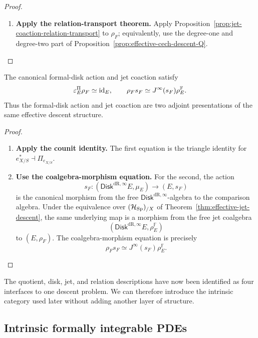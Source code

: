 \begin{proof}
\leavevmode
\begin{enumerate}[label=\textup{(\arabic*)}]
    \item \textbf{Apply the relation-transport theorem.}
Apply Proposition~\ref{prop:jet-coaction-relation-transport} to
\(\rho_F\); equivalently, use the degree-one and degree-two part of
Proposition~\ref{prop:effective-cech-descent-Q}.
\end{enumerate}
\end{proof}

\begin{proposition}
\label{prop:mate-relation-explicit}
The canonical formal-disk action and jet coaction satisfy
\[
  \varepsilon^\Pi_E\rho_F\simeq\operatorname{id}_E,
  \qquad
  \rho_Fs_F\simeq J^\infty(s_F)\rho_E^{\mathbb F}.
\]
Thus the formal-disk action and jet coaction are two adjoint presentations of the
same effective descent structure.
\end{proposition}

\begin{proof}
\leavevmode
\begin{enumerate}[label=\textup{(\arabic*)}]
    \item \textbf{Apply the counit identity.}
The first equation is the triangle identity for
\(e_{X/S}^*\dashv\Pi_{e_{X/S}}\).

    \item \textbf{Use the coalgebra-morphism equation.}
For the second, the action
\[
  s_F:(\mathsf{Disk}^{\mathrm{dR},\infty} E,\mu_E)\longrightarrow(E,s_F)
\]
is the canonical morphism from the free \(\mathsf{Disk}^{\mathrm{dR},\infty}\)-algebra to the comparison
algebra. Under the equivalence over \((\mathcal H_{\operatorname{Sp}})_{/X}\) of
Theorem~\ref{thm:effective-jet-descent}, the same underlying map is a morphism
from the free jet coalgebra
\[
  (\mathsf{Disk}^{\mathrm{dR},\infty} E,\rho_E^{\mathbb F})
\]
to \((E,\rho_F)\). The coalgebra-morphism equation is precisely
\[
  \rho_Fs_F\simeq J^\infty(s_F)\rho_E^{\mathbb F}.
\]
\end{enumerate}
\end{proof}

The quotient, disk, jet, and relation descriptions have now been identified as
four interfaces to one descent problem. We can therefore introduce the
intrinsic category used later without adding another layer of structure.

\subsection{Intrinsic formally integrable PDEs}
\label{sec:PDE-topos}

